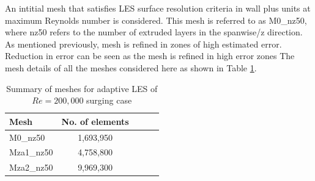 An intitial mesh that satisfies LES surface resolution criteria in wall plus units at maximum Reynolds number is considered.
This mesh is referred to as M0\_nz50, where nz50 refers to the number of extruded layers in the spanwise/z direction.
As mentioned previously, mesh is refined in zones of high estimated error. 
Reduction in error can be seen as the mesh is refined in high error zones
The mesh details of all the meshes considered here as shown in Table \ref{table:adapt_mesh_details_Re200k}.

\begin{table}[H]
	\centering
	\caption{Summary of meshes for adaptive LES of $Re=200,000$ surging case}
	\label{table:adapt_mesh_details_Re200k}
	\begin{tabular}{|l|c|c|c|c|}
		\hline
		Mesh   & No. of elements \\
		\hline
		M0\_nz50	& 1,693,950 \\
		\hline
		Mza1\_nz50	& 4,758,800 \\
		\hline		
		Mza2\_nz50  &  9,969,300 \\
		\hline
	\end{tabular}
\end{table}


